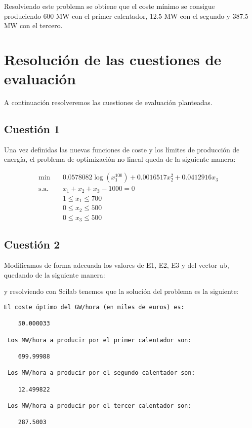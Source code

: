 \documentclass[12pt,a4paper,twoside,openright,titlepage,final]{article}
\begin{document}
Resolviendo este problema se obtiene que el coste mínimo se consigue produciendo 600 MW con el primer calentador, 12.5 MW con el segundo y 387.5 MW con el tercero.

\section{Resolución de las cuestiones de evaluación}

A continuación resolveremos las cuestiones de evaluación planteadas.

\subsection{Cuestión 1}

Una vez definidas las nuevas funciones de coste y los límites de producción de energía, el problema de optimización no lineal queda de la siguiente manera:

\begin{align*}
\mathrm{min} & \ & 0.0578082\log(x_1^{100}) + 0.0016517x_2^2 + 0.0412916x_3\\
\text{s.a.} & \  & x_1 + x_2 + x_3 - 1000 = 0 \\
& \    & 1 \leq x_1 \leq 700 \\
& \    & 0 \leq x_2 \leq 500 \\
& \    & 0 \leq x_3 \leq 500
\end{align*}

\subsection{Cuestión 2}

Modificamos de forma adecuada los valores de E1, E2, E3 y del vector ub, quedando de la siguiente manera:

%

 y resolviendo con Scilab tenemos que la solución del problema es la siguiente:

\begin{verbatim}
El coste óptimo del GW/hora (en miles de euros) es:   
 
    50.000033  
 
 Los MW/hora a producir por el primer calentador son:   
 
    699.99988  
 
 Los MW/hora a producir por el segundo calentador son:   
 
    12.499822  
 
 Los MW/hora a producir por el tercer calentador son:   
 
    287.5003  
\end{verbatim}
\end{document}
